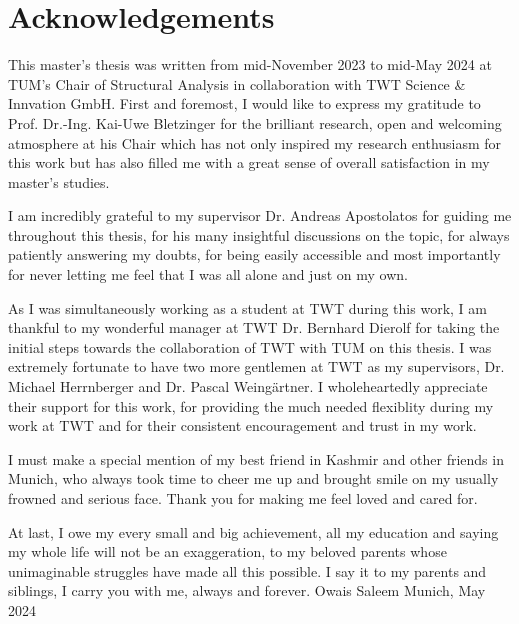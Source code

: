 \documentclass[12pt, a4paper]{report}
\begin{document}
\newpage

\chapter*{Acknowledgements}
This master's thesis was written from mid-November 2023 to mid-May 2024 at TUM's Chair of Structural Analysis in collaboration with TWT Science \& Innvation GmbH.\newline
First and foremost, I would like to express my gratitude to Prof. Dr.-Ing. Kai-Uwe Bletzinger for the brilliant research, open and welcoming atmosphere at his Chair which has not only inspired my research enthusiasm for this work but has also filled me with a great sense of overall satisfaction in my master's studies. \par
I am incredibly grateful to my supervisor Dr. Andreas Apostolatos for guiding me throughout this thesis, for his many insightful discussions on the topic, for always patiently answering my doubts, for being easily accessible and most importantly for never letting me feel that I was all alone and just on my own.\par
As I was simultaneously working as a student at TWT during this work, I am thankful to my wonderful manager at TWT Dr. Bernhard Dierolf for taking the initial steps towards the collaboration of TWT with TUM on this thesis. I was extremely fortunate to have two more gentlemen at TWT as my supervisors, Dr. Michael Herrnberger and Dr. Pascal Weingärtner. I wholeheartedly appreciate their support for this work, for providing the much needed flexiblity during my work at TWT and for their consistent encouragement and trust in my work.\par
I must make a special mention of my best friend in Kashmir and other friends in Munich, who always took time to cheer me up and brought smile on my usually frowned and serious face. Thank you for making me feel loved and cared for. \par
At last, I owe my every small and big achievement, all my education and saying my whole life will not be an exaggeration, to my beloved parents whose unimaginable struggles have made all this possible. I say it to my parents and siblings, I carry you with me, always and forever.\newline
Owais Saleem\newline
Munich, May 2024
\end{document}
